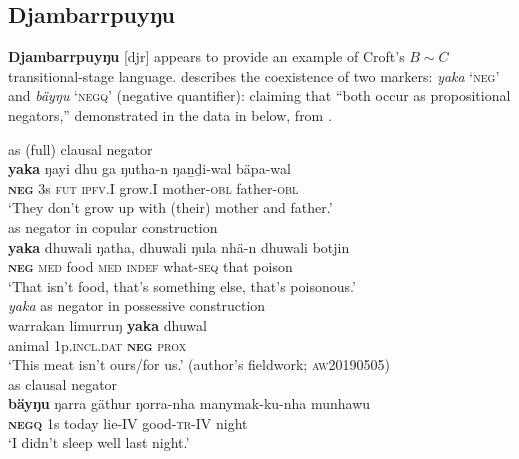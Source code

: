 \documentclass[output=paper]{langsci/langscibook}
\begin{document}
\subsection{Djambarrpuyŋu}\label{sec:austr-4.1}

\textbf{Djambarrpuyŋu} [djr] appears to provide an example of Croft's $B\sim C$ transitional-stage language. \citet[356]{Wilkinson1991} describes the coexistence of two markers: \textit{yaka} `\textsc{neg}' and \textit{bäyŋu} `\textsc{negq}' (negative quantifier): claiming that ``both occur as propositional negators,'' demonstrated in the data in  below, from \citet{Wilkinson1991}.

\begin{exe}\ex\label{ex:austr-djamb-negmarkers}
    \begin{xlist}
 as (full) clausal negator\\
\gll \textbf{yaka} ŋayi dhu ga ŋutha-n ŋaṉḏi-wal bäpa-wal\\
\textsc{\textbf{neg}} 3s \textsc{fut} \textsc{ipfv.I} grow.I mother\textsc{-obl} father\textsc{-obl}\\
\glt  `They don't grow up with (their) mother and father.'\\ \hfill {\citep[691]{Wilkinson1991}}
%
 as negator in copular construction\\
\gll \textbf{yaka} dhuwali ŋatha, dhuwali ŋula nhä-n dhuwali botjin\\
\textsc{\textbf{neg}} \textsc{med} food \textsc{med} \textsc{indef} what-\textsc{seq} that poison\\
\glt `That isn't food, that's something else, that's poisonous.'\\ \hfill {\citep[560]{Wilkinson1991}}
        \ex\label{ex:austr-djamb-negmarkers-meat} 
        \emph{yaka} as negator in possessive construction\\
\gll warrakan limurruŋ \textbf{yaka} dhuwal\\
animal 1p.\textsc{incl.dat} \textbf{\textsc{neg}} \textsc{prox}\\
\glt `This meat isn't ours\slash for us.' \hfill {(author's fieldwork;
        \textsc{aw20190505})}\\%
%
 as clausal negator\\
\gll \textbf{bäyŋu} ŋarra gäthur ŋorra-nha manymak-ku-nha munhawu\\
\textsc{\textbf{negq}} 1s today lie\textsc{-IV} good-\textsc{tr-IV} night\\
\glt  `I didn't sleep well last night.'\hfill\citep[357]{Wilkinson1991}\\
    \end{xlist}\end{exe}
\end{document}
